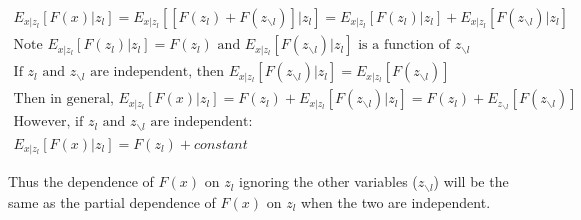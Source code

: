 \documentclass[11pt]{article}
\begin{document}
\begin{gather*}
E_{x|z_{l}}[F(x)|z_{l}] = E_{x|z_{l}}[[F(z_{l}) + F(z_{\backslash l})]|z_{l}] = 
E_{x|z_{l}}[F(z_{l})|z_{l}] + E_{x|z_{l}}[F(z_{\backslash l})|z_{l}]\\
\text{Note } E_{x|z_{l}}[F(z_{l})|z_{l}] = F(z_{l}) \text{ and } 
E_{x|z_{l}}[F(z_{\backslash l})|z_{l}] \text{ is a function of } z_{\backslash l}\\
\text{If } z_{l} \text{ and } z_{\backslash l} \text{ are independent, then }
E_{x|z_{l}}[F(z_{\backslash l})|z_{l}] = E_{x|z_{l}}[F(z_{\backslash l})]\\
\text{Then in general, } E_{x|z_{l}}[F(x)|z_{l}] = 
F(z_{l}) + E_{x|z_{l}}[F(z_{\backslash l})|z_{l}] = F(z_{l}) + E_{z_{\backslash l}}[F(z_{\backslash l})]\\
\text{However, if } z_{l} \text{ and } z_{\backslash l} \text{ are independent:}\\
E_{x|z_{l}}[F(x)|z_{l}] = F(z_{l}) + constant
\end{gather*}

\vspace{5 mm}
\noindent
Thus the dependence of $F(x)$ on $z_{l}$ ignoring the other variables 
($z_{\backslash l}$) will be the same as the partial dependence of $F(x)$ on 
$z_{l}$ when the two are independent.
\end{document}
